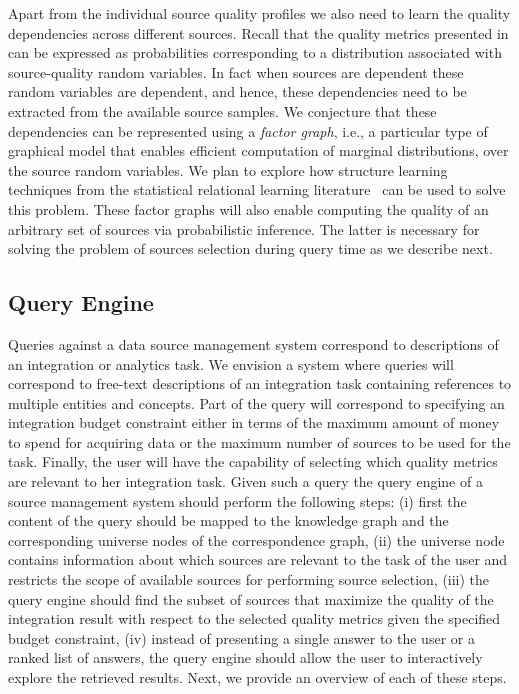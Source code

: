 \documentclass{sig-alternate}
\begin{document}
Apart from the individual source quality profiles we also need to learn the quality dependencies across different sources. Recall that the quality metrics presented in  
can be expressed as probabilities corresponding to a distribution associated with source-quality random variables. In fact when sources are dependent these random variables are dependent, and hence, these dependencies need to be extracted from the available source samples.  We conjecture that these dependencies can be represented using a {\em factor graph}, i.e., a particular type of graphical model that enables efficient computation of marginal distributions, over the source random variables. We plan to explore how structure learning techniques from the statistical relational learning literature~\cite{getoor:2007} can be used to solve this problem. These factor graphs will also enable computing the quality of an arbitrary set of sources via probabilistic inference. The latter is necessary for solving the problem of sources selection during query time as we describe next. 

\subsection{Query Engine}
Queries against a data source management system correspond to descriptions of an integration or analytics task. We envision a system where queries will correspond to free-text descriptions of an integration task containing references to multiple entities and concepts. Part of the query will correspond to specifying an integration budget constraint either in terms of the maximum amount of money to spend for acquiring data or the maximum number of sources to be used for the task. Finally, the user will have the capability of selecting which quality metrics are relevant to her integration task. Given such a query the query engine of a source management system should perform the following steps: (i) first the content of the query should be mapped to the knowledge graph and the corresponding universe nodes of the correspondence graph, (ii) the universe node contains information about which sources are relevant to the task of the user and restricts the scope of available sources for performing source selection, (iii) the query engine should find the subset of sources that maximize the quality of the integration result with respect to the selected quality metrics given the specified budget constraint, (iv) instead of presenting a single answer to the user or a ranked list of answers, the query engine should allow the user to interactively explore the retrieved results. Next, we provide an overview of each of these steps.
\end{document}
